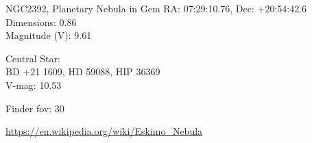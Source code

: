 \begin{block}{NGC2392, Planetary Nebula in Gem}
    RA: 07:29:10.76, Dec: +20:54:42.6 \\ 
    Dimensions: 0.86 \\ 
    Magnitude (V): 9.61


    Central Star: \\ 
      \hspace{1em}BD +21 1609, HD 59088, HIP 36369 \\ 
      \hspace{1em}V-mag: 10.53 


    Finder fov: 30 

    \url{https://en.wikipedia.org/wiki/Eskimo_Nebula} 
\end{block}